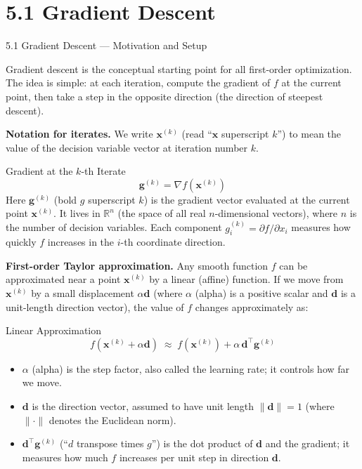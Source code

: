 \documentclass[aspectratio=169,10pt]{beamer}
\newcommand{\vx}{\mathbf{x}}
\newcommand{\vg}{\mathbf{g}}
\newcommand{\vd}{\mathbf{d}}
\newcommand{\R}{\mathbb{R}}
\begin{document}
\section{5.1 Gradient Descent}

\begin{frame}[allowframebreaks]{5.1 Gradient Descent --- Motivation and Setup}

  Gradient descent is the conceptual starting point for all
  first-order optimization.  The idea is simple: at each
  iteration, compute the gradient of $f$ at the current point,
  then take a step in the opposite direction (the direction of
  steepest descent).

  \vspace{0.5em}
  \textbf{Notation for iterates.}  We write
  $\vx^{(k)}$ (read ``$\vx$ superscript $k$'') to mean the value
  of the decision variable vector at iteration number $k$.

  \begin{block}{Gradient at the $k$-th Iterate}
    \[
      \vg^{(k)} = \nabla f\!\left(\vx^{(k)}\right)
    \]
    Here $\vg^{(k)}$ (bold $g$ superscript $k$) is the
    gradient vector evaluated at the current point $\vx^{(k)}$.
    It lives in $\R^n$ (the space of all real $n$-dimensional
    vectors), where $n$ is the number of decision variables.
    Each component $g_i^{(k)} = \partial f / \partial x_i$
    measures how quickly $f$ increases in the $i$-th coordinate
    direction.
  \end{block}

  \textbf{First-order Taylor approximation.}  Any smooth
  function $f$ can be approximated near a point $\vx^{(k)}$
  by a linear (affine) function.  If we move from $\vx^{(k)}$
  by a small displacement $\alpha\vd$ (where
  $\alpha$ (alpha) is a positive scalar and
  $\vd$ is a unit-length direction vector), the value of $f$
  changes approximately as:

  \begin{block}{Linear Approximation}
    \[
      f\!\left(\vx^{(k)}+\alpha\vd\right)
      \;\approx\;
      f\!\left(\vx^{(k)}\right) + \alpha\,\vd^\top\vg^{(k)}
    \]
    \begin{itemize}
      \item $\alpha$ (alpha) is the step factor, also called
            the learning rate; it controls how far we move.
      \item $\vd$ is the direction vector, assumed to have
            unit length $\|\vd\| = 1$
            (where $\|\cdot\|$ denotes the Euclidean norm).
      \item $\vd^\top\vg^{(k)}$ (``$d$ transpose times $g$'')
            is the dot product of $\vd$ and the gradient;
            it measures how much $f$ increases per unit step
            in direction $\vd$.
    \end{itemize}
  \end{block}


\end{frame}
\end{document}
